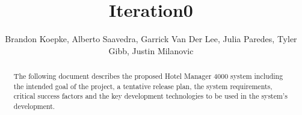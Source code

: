 \begin{frontmatter}
	\title{Iteration0}
	\author{Brandon Koepke, Alberto Saavedra, Garrick Van Der Lee, Julia Paredes, Tyler Gibb, Justin Milanovic}
	\begin{abstract}
		The following document describes the proposed Hotel Manager 4000 system including the intended goal of the project, a tentative release plan, the system requirements, critical success factors and the key development technologies to be used in the system's development.
	\end{abstract}
\end{frontmatter}
\tableofcontents
\clearpage
